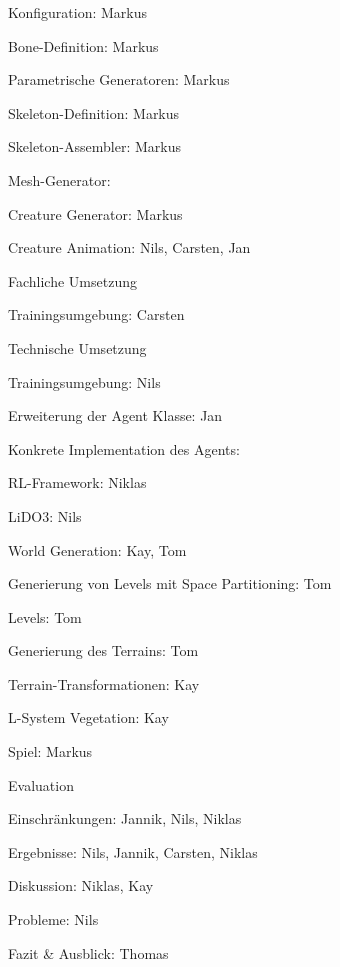 \begin{thallok}
\begin{thallok}
\begin{thallok}
\begin{thallok}
				\item Konfiguration: Markus
				\item Bone-Definition: Markus
				\item Parametrische Generatoren: Markus
				\item Skeleton-Definition: Markus
				\item Skeleton-Assembler: Markus
				\item Mesh-Generator:
				\item Creature Generator: Markus
			\end{thallok}
		\end{thallok}
		\item Creature Animation: Nils, Carsten, Jan
		\begin{thallok}
			\item Fachliche Umsetzung
			\begin{thallok}
				\item Trainingsumgebung: Carsten
			\end{thallok}
			\item Technische Umsetzung
			\begin{thallok}
				\item Trainingsumgebung: Nils
				\item Erweiterung der Agent Klasse: Jan
				\item Konkrete Implementation des Agents:
				\item RL-Framework: Niklas
				\item LiDO3: Nils
			\end{thallok}
		\end{thallok}
		\item World Generation: Kay, Tom
		\begin{thallok}
			\item Generierung von Levels mit Space Partitioning: Tom
			\item Levels: Tom
			\item Generierung des Terrains: Tom
			\item Terrain-Transformationen: Kay
			\item L-System Vegetation: Kay
		\end{thallok}
		\item Spiel: Markus
	\end{thallok}
	\item Evaluation
	\begin{thallok}
		\item Einschränkungen: Jannik, Nils, Niklas
		\item Ergebnisse: Nils, Jannik, Carsten, Niklas
		\item Diskussion: Niklas, Kay
		\item Probleme: Nils
	\end{thallok}
	\item Fazit \& Ausblick: Thomas
\end{thallok}

